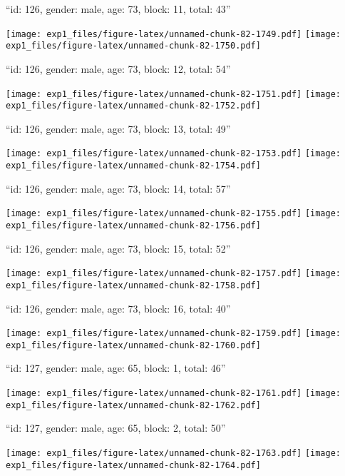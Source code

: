 \documentclass[11pt,,]{article}
\begin{document}
\newpage
[1] 

``id: 126, gender: male, age: 73, block: 11, total: 43''

\texttt{[image: exp1\_files/figure-latex/unnamed-chunk-82-1749.pdf]}
\texttt{[image: exp1\_files/figure-latex/unnamed-chunk-82-1750.pdf]}

\newpage
[1] 

``id: 126, gender: male, age: 73, block: 12, total: 54''

\texttt{[image: exp1\_files/figure-latex/unnamed-chunk-82-1751.pdf]}
\texttt{[image: exp1\_files/figure-latex/unnamed-chunk-82-1752.pdf]}

\newpage
[1] 

``id: 126, gender: male, age: 73, block: 13, total: 49''

\texttt{[image: exp1\_files/figure-latex/unnamed-chunk-82-1753.pdf]}
\texttt{[image: exp1\_files/figure-latex/unnamed-chunk-82-1754.pdf]}

\newpage
[1] 

``id: 126, gender: male, age: 73, block: 14, total: 57''

\texttt{[image: exp1\_files/figure-latex/unnamed-chunk-82-1755.pdf]}
\texttt{[image: exp1\_files/figure-latex/unnamed-chunk-82-1756.pdf]}

\newpage
[1] 

``id: 126, gender: male, age: 73, block: 15, total: 52''

\texttt{[image: exp1\_files/figure-latex/unnamed-chunk-82-1757.pdf]}
\texttt{[image: exp1\_files/figure-latex/unnamed-chunk-82-1758.pdf]}

\newpage
[1] 

``id: 126, gender: male, age: 73, block: 16, total: 40''

\texttt{[image: exp1\_files/figure-latex/unnamed-chunk-82-1759.pdf]}
\texttt{[image: exp1\_files/figure-latex/unnamed-chunk-82-1760.pdf]}

\newpage
[1] 

``id: 127, gender: male, age: 65, block: 1, total: 46''

\texttt{[image: exp1\_files/figure-latex/unnamed-chunk-82-1761.pdf]}
\texttt{[image: exp1\_files/figure-latex/unnamed-chunk-82-1762.pdf]}

\newpage
[1] 

``id: 127, gender: male, age: 65, block: 2, total: 50''

\texttt{[image: exp1\_files/figure-latex/unnamed-chunk-82-1763.pdf]}
\texttt{[image: exp1\_files/figure-latex/unnamed-chunk-82-1764.pdf]}
\end{document}
